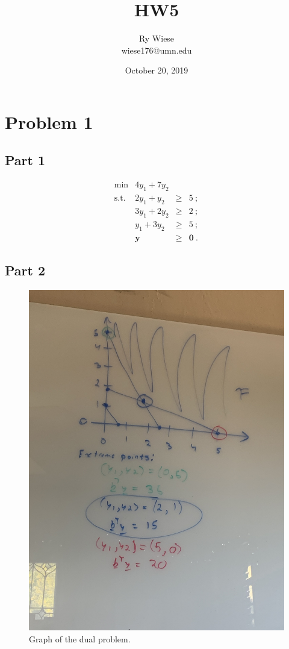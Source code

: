 \documentclass{article}
\title{HW5}
\author{Ry Wiese\\wiese176@umn.edu}
\date{October 20, 2019}
\begin{document}
\maketitle

\section{Problem 1}

\subsection{Part 1}

\[
\begin{array}{rrcl}
 \min & 4y_1 + 7y_2  &      &   \\
 \mbox{s.t.}  &  2y_1 + y_2  & \ge & 5~; \\
              &  3y_1 + 2y_2 & \ge & 2~; \\
              &  y_1 + 3y_2 & \ge & 5~; \\
     &   \mathbf{y}  & \geq & \mathbf{0}~.
\end{array}
\]

\subsection{Part 2}

\begin{figure}[h] %
  \centering
  \includegraphics[angle=270,totalheight=80mm]{P1.jpg}
  \caption{Graph of the dual problem.}
  \label{fig:tabl}
\end{figure}
\end{document}
